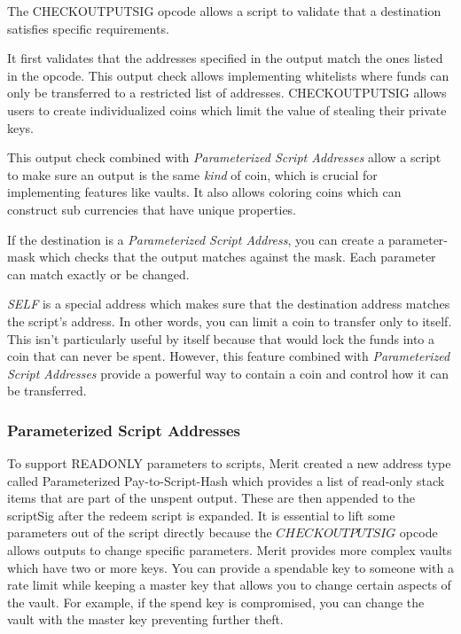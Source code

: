 \documentclass{article}
\begin{document}
The CHECKOUTPUTSIG opcode allows a script to validate that a destination satisfies
specific requirements.

It first validates that the addresses specified in the output match the ones
listed in the opcode. This output check allows implementing whitelists where funds
can only be transferred to a restricted list of addresses. CHECKOUTPUTSIG allows
users to create individualized coins which limit the value of stealing their private keys.

This output check combined with \emph{Parameterized Script Addresses}
allow a script to make sure an output is the same \emph{kind} of coin, which is crucial
for implementing features like vaults. It also allows coloring coins which can
construct sub currencies that have unique properties.

If the destination is a \emph{Parameterized Script Address}, you can create a parameter-mask
which checks that the output matches against the mask. Each parameter can match
exactly or be changed.

\emph{SELF} is a special address which makes sure that the destination address
matches the script's address. In other words, you can limit a coin to transfer
only to itself. This isn't particularly useful by itself because that would lock
the funds into a coin that can never be spent. However, this feature combined
with \emph{Parameterized Script Addresses} provide a powerful way to contain a
coin and control how it can be transferred.

\subsubsection{Parameterized Script Addresses}

To support READONLY parameters to scripts, Merit created a new address type called
Parameterized Pay-to-Script-Hash which provides a list of read-only stack items
that are part of the unspent output. These are then appended to the scriptSig
after the redeem script is expanded. It is essential to lift some parameters
out of the script directly because the $CHECKOUTPUTSIG$ opcode allows outputs
to change specific parameters. Merit provides more complex vaults which have two or
more keys. You can provide a spendable key to someone with a rate limit while
keeping a master key that allows you to change certain aspects of the vault.
For example, if the spend key is compromised, you can change the vault with
the master key preventing further theft.
\end{document}
